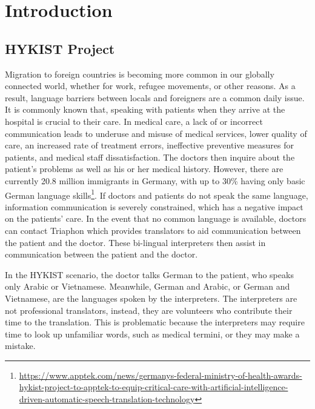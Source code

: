 \chapter{Introduction}
\label{ch: Introduction}

\section{HYKIST Project}
\label{sec: HYKIST Project}

Migration to foreign countries is becoming more common in our globally connected world, whether for work, refugee movements, or other reasons.
As a result, language barriers between locals and foreigners are a common daily issue.
It is commonly known that, speaking with patients when they arrive at the hospital is crucial to their care. 
In medical care, a lack of or incorrect communication leads to underuse and misuse of medical services, lower quality of care, an increased rate of treatment errors, ineffective preventive measures for patients, and medical staff dissatisfaction.
The doctors then inquire about the patient's problems as well as his or her medical history. 
However, there are currently 20.8 million immigrants in Germany, with up to 30\% having only basic German language skills\footnote{\href{https://www.apptek.com/news/germanys-federal-ministry-of-health-awards-hykist-project-to-apptek-to-equip-critical-care-with-artificial-intelligence-driven-automatic-speech-translation-technology}{https://www.apptek.com/news/germanys-federal-ministry-of-health-awards-hykist-project-to-apptek-to-equip-critical-care-with-artificial-intelligence-driven-automatic-speech-translation-technology}}. 
If doctors and patients do not speak the same language, information communication is severely constrained, which has a negative impact on the patients' care. 
In the event that no common language is available, doctors can contact Triaphon which provides translators to aid communication between the patient and the doctor. 
These bi-lingual interpreters then assist in communication between the patient and the doctor.

In the HYKIST scenario, the doctor talks German to the patient, who speaks only Arabic or Vietnamese. 
Meanwhile, German and Arabic, or German and Vietnamese, are the languages spoken by the interpreters. 
The interpreters are not professional translators, instead, they are volunteers who contribute their time to the translation. 
This is problematic because the interpreters may require time to look up unfamiliar words, such as medical termini, or they may make a mistake.

